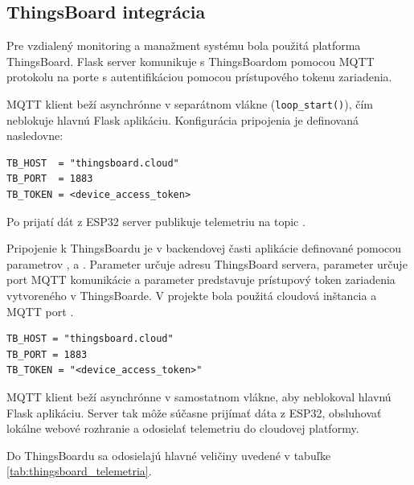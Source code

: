 \begin{figure}[H]
    \centering
    \label{fig:json_log}
\end{figure}

\subsection{ThingsBoard integrácia}

Pre vzdialený monitoring a manažment systému bola použitá platforma ThingsBoard. 
Flask server komunikuje s ThingsBoardom pomocou MQTT protokolu na porte 
 s autentifikáciou pomocou prístupového tokenu zariadenia. 

MQTT klient beží asynchrónne v separátnom vlákne (\texttt{loop\_start()}), čím neblokuje hlavnú Flask aplikáciu. Konfigurácia pripojenia je definovaná nasledovne:

\begin{verbatim}
TB_HOST  = "thingsboard.cloud"
TB_PORT  = 1883
TB_TOKEN = <device_access_token>
\end{verbatim}


Po prijatí dát z ESP32 server publikuje telemetriu na topic 
.

Pripojenie k ThingsBoardu je v backendovej časti aplikácie definované pomocou parametrov 
,  a . Parameter  určuje adresu 
ThingsBoard servera, parameter  určuje port MQTT komunikácie a parameter 
 predstavuje prístupový token zariadenia vytvoreného v ThingsBoarde. 
V projekte bola použitá cloudová inštancia  a MQTT port .

\begin{lstlisting}[caption={Základné nastavenie pripojenia k ThingsBoardu}]
TB_HOST = "thingsboard.cloud"
TB_PORT = 1883
TB_TOKEN = "<device_access_token>"
\end{lstlisting}

MQTT klient beží asynchrónne v samostatnom vlákne, aby neblokoval hlavnú Flask aplikáciu. 
Server tak môže súčasne prijímať dáta z ESP32, obsluhovať lokálne webové rozhranie a odosielať 
telemetriu do cloudovej platformy.

Do ThingsBoardu sa odosielajú hlavné veličiny uvedené v tabuľke \ref{tab:thingsboard_telemetria}.

